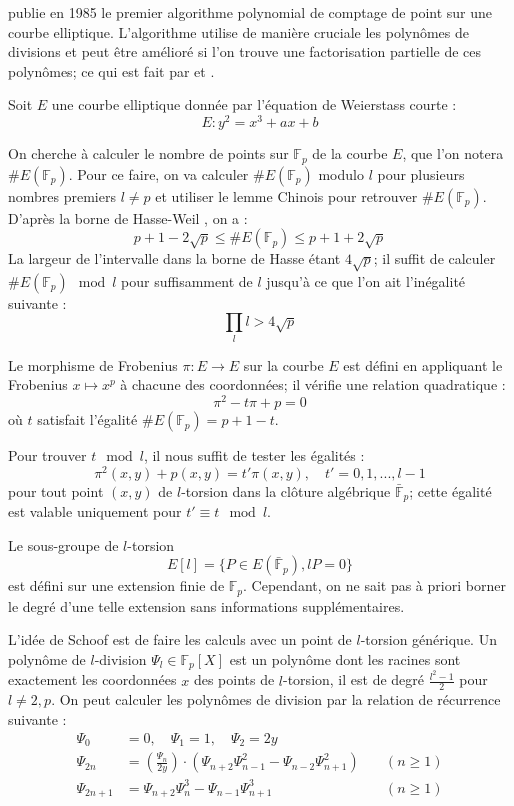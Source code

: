 \documentclass[a4paper,12pt]{article}
\theoremstyle{definition}
\theoremstyle{remark}
\numberwithin{equation}{section}
\begin{document}
\citet{schoof} publie en 1985 le premier algorithme polynomial de comptage de point sur une courbe elliptique. L'algorithme utilise de manière cruciale les polynômes de divisions et peut être amélioré si l'on trouve une factorisation partielle de ces polynômes; ce qui est fait par \citet{atkin} et \citet{elkies}.

Soit $E$ une courbe elliptique donnée par l'équation de Weierstass courte :
$$E : y^2 = x^3 + ax + b$$

On cherche à calculer le nombre de points sur $\mathbb{F}_p$ de la courbe $E$, que l'on notera $\#E(\mathbb{F}_p)$. Pour ce faire, on va calculer $\#E(\mathbb{F}_p)$ modulo $l$ pour plusieurs nombres premiers $l \neq p$ et utiliser le lemme Chinois pour retrouver $\#E(\mathbb{F}_p)$. D'après la borne de Hasse-Weil \citep{weil}, on a :
$$p+1 - 2\sqrt{p} \leq \#E(\mathbb{F}_p) \leq p+1 + 2\sqrt{p}$$
La largeur de l'intervalle dans la borne de Hasse étant $4\sqrt{p}$; il suffit de calculer $\#E(\mathbb{F}_p) \mod l$ pour suffisamment de $l$ jusqu'à ce que l'on ait l'inégalité suivante :
\begin{equation}
\label{inegaliteSchoof}
\prod_l l > 4\sqrt{p}
\end{equation}

Le morphisme de Frobenius $\pi : E \longrightarrow E$ sur la courbe $E$ est défini en appliquant le Frobenius $x \mapsto x^p$ à chacune des coordonnées; il vérifie une relation quadratique :
$$\pi^2 - t\pi + p = 0$$
où $t$ satisfait l'égalité $\#E(\mathbb{F}_p) = p + 1 - t$.

Pour trouver $t \mod l$, il nous suffit de tester les égalités :
$$\pi^2(x,y) + p(x,y) = t'\pi(x,y), \quad t' = 0,1,...,l-1$$
pour tout point $(x,y)$ de $l$-torsion dans la clôture algébrique $\bar{\mathbb{F}}_p$; cette égalité est valable uniquement pour $t' \equiv t \mod l$.

Le sous-groupe de $l$-torsion
$$E[l] = \{P \in E(\bar{\mathbb{F}}_p), lP = 0\}$$
est défini sur une extension finie de $\mathbb{F}_p$. Cependant, on ne sait pas à priori borner le degré d'une telle extension sans informations supplémentaires.

L'idée de Schoof est de faire les calculs avec un point de $l$-torsion générique. Un polynôme de $l$-division $\Psi_l \in \mathbb{F}_p[X]$ est un polynôme dont les racines sont exactement les coordonnées $x$ des points de $l$-torsion, il est de degré $\frac{l^2-1}{2}$ pour $l \neq 2,p$. On peut calculer les polynômes de division par la relation de récurrence suivante :
\begin{align*}
\Psi_{0} &= 0, \quad \Psi_{1} = 1, \quad \Psi_{2} = 2y \\
\Psi_{2n} &=  \left ( \frac { \Psi_{n}}{2y} \right ) \cdot ( \Psi_{n+2}\Psi^{2}_{n-1} -  \Psi_{n-2} \Psi ^{2}_{n+1})  \quad &(n \geq 1) \\
\Psi_{2n+1} &=  \Psi_{n+2} \Psi_{n}^{ 3}  -  \Psi_{n-1} \Psi ^{3}_{n+1} \quad &(n \geq 1)
\end{align*}
\end{document}
